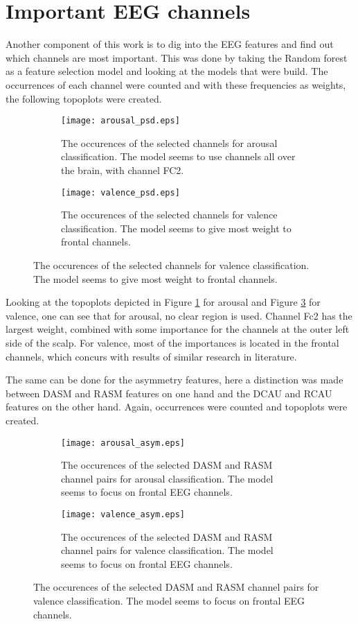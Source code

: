 \section{Important EEG channels}

Another component of this work is to dig into the EEG features and find out which channels are most important. This was done by taking the Random forest as a feature selection model and looking at the models that were build. The occurrences of each channel were counted and with these frequencies as weights, the following topoplots were created.

\begin{figure}[H]
\centering
  \begin{subfigure}[b]{.4\textwidth}
    \texttt{[image: arousal\_psd.eps]}
    \caption{The occurences of the selected channels for arousal classification. The model seems to use channels all over the brain, with channel FC2.\label{arousalchannel}}
  \end{subfigure}
\hfill
  \begin{subfigure}[b]{.4\textwidth}
    \texttt{[image: valence\_psd.eps]}
    \caption{The occurences of the selected channels for valence classification. The model seems to give most weight to frontal channels.\label{valencechannel}}
  \end{subfigure}
\end{figure}


Looking at the topoplots depicted in Figure \ref{arousalchannel} for arousal and Figure \ref{valencechannel} for valence, one can see that for arousal, no clear region is used. Channel Fc2 has the largest weight, combined with some importance for the channels at the outer left side of the scalp. For valence, most of the importances is located in the frontal channels, which concurs with results of similar research in literature. 

\npar

The same can be done for the asymmetry features, here a distinction was made between DASM and RASM features on one hand and the DCAU and RCAU features on the other hand. Again, occurrences were counted and topoplots were created.

\begin{figure}[H]
\centering
  \begin{subfigure}[b]{.4\textwidth}
    \texttt{[image: arousal\_asym.eps]}
    \caption{The occurences of the selected DASM and RASM channel pairs for arousal classification. The model seems to focus on frontal EEG channels.\label{arousal_asym}}
  \end{subfigure}
\hfill
  \begin{subfigure}[b]{.4\textwidth}
    \texttt{[image: valence\_asym.eps]}
    \caption{The occurences of the selected DASM and RASM channel pairs for valence classification. The model seems to focus on frontal EEG channels.\label{valence_asym}}
  \end{subfigure}
\end{figure}

